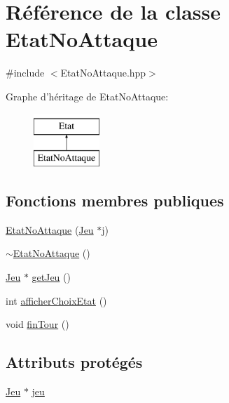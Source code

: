 \hypertarget{class_etat_no_attaque}{\section{Référence de la classe Etat\-No\-Attaque}
\label{class_etat_no_attaque}
}


{\ttfamily \#include $<$Etat\-No\-Attaque.\-hpp$>$}

Graphe d'héritage de Etat\-No\-Attaque\-:\begin{figure}[H]
\begin{center}
\leavevmode
\includegraphics[height=2.000000cm]{class_etat_no_attaque}
\end{center}
\end{figure}
\subsection*{Fonctions membres publiques}
\begin{DoxyCompactItemize}
\item 
\hyperlink{class_etat_no_attaque_a39b37880a28e5cbda92e584221b9a68d}{Etat\-No\-Attaque} (\hyperlink{class_jeu}{Jeu} $\ast$j)
\item 
\hyperlink{class_etat_no_attaque_a81a0114551961e5780e7e3866f22c6fb}{$\sim$\-Etat\-No\-Attaque} ()
\item 
\hyperlink{class_jeu}{Jeu} $\ast$ \hyperlink{class_etat_no_attaque_ab98d57f8da5876194e0c1496f137c613}{get\-Jeu} ()
\item 
int \hyperlink{class_etat_no_attaque_ac89ab0d1f4483c7623617299b08922e3}{afficher\-Choix\-Etat} ()
\item 
void \hyperlink{class_etat_no_attaque_aea58b2b3580f3adbd93a4fa69398b51e}{fin\-Tour} ()
\end{DoxyCompactItemize}
\subsection*{Attributs protégés}
\begin{DoxyCompactItemize}
\item 
\hyperlink{class_jeu}{Jeu} $\ast$ \hyperlink{class_etat_no_attaque_ad5dbee65b31bd41e28a648ac22bbbfce}{jeu}
\end{DoxyCompactItemize}


